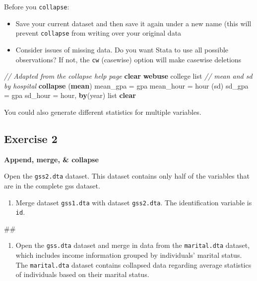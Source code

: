 \documentclass[
]{book}
\newenvironment{Shaded}{\begin{snugshade}}{\end{snugshade}}
\newcommand{\CommentTok}[1]{\textcolor[rgb]{0.56,0.35,0.01}{\textit{#1}}}
\newcommand{\FunctionTok}[1]{\textcolor[rgb]{0.00,0.00,0.00}{#1}}
\newcommand{\KeywordTok}[1]{\textcolor[rgb]{0.13,0.29,0.53}{\textbf{#1}}}
\newcommand{\NormalTok}[1]{#1}
\newcommand{\OtherTok}[1]{\textcolor[rgb]{0.56,0.35,0.01}{#1}}
\providecommand{\tightlist}{%
  \setlength{\itemsep}{0pt}\setlength{\parskip}{0pt}}
\begin{document}
Before you \texttt{collapse}:

\begin{itemize}
\tightlist
\item
  Save your current dataset and then save it again under a new name (this will prevent \texttt{collapse} from writing over your original data
\item
  Consider issues of missing data. Do you want Stata to use all possible observations? If not, the \texttt{cw} (casewise) option will make casewise deletions
\end{itemize}

\begin{Shaded}
\begin{Highlighting}[]
\CommentTok{// Adapted from the collapse help page}
\KeywordTok{clear}
\KeywordTok{webuse}\NormalTok{ college}
\OtherTok{list}
\CommentTok{// mean and sd by hospital}
\KeywordTok{collapse}\NormalTok{ (}\KeywordTok{mean}\NormalTok{) mean\_gpa = gpa mean\_hour = hour (}\FunctionTok{sd}\NormalTok{) sd\_gpa = gpa sd\_hour = hour, }\KeywordTok{by}\NormalTok{(}\FunctionTok{year}\NormalTok{)}
\OtherTok{list}
\KeywordTok{clear}
\end{Highlighting}
\end{Shaded}

You could also generate different statistics for multiple variables.

\hypertarget{exercise-2-5}{%
\subsection{Exercise 2}\label{exercise-2-5}}

\textbf{Append, merge, \& collapse}

Open the \texttt{gss2.dta} dataset. This dataset contains only half of the variables that are in the complete gss dataset.

\begin{enumerate}
\def\labelenumi{\arabic{enumi}.}
\tightlist
\item
  Merge dataset \texttt{gss1.dta} with dataset \texttt{gss2.dta}. The identification variable is \texttt{id}.
\end{enumerate}

\begin{Shaded}
\begin{Highlighting}[]
\NormalTok{\#\#}
\end{Highlighting}
\end{Shaded}

\begin{enumerate}
\def\labelenumi{\arabic{enumi}.}
\setcounter{enumi}{1}
\tightlist
\item
  Open the \texttt{gss.dta} dataset and merge in data from the \texttt{marital.dta} dataset, which includes income information grouped by individuals' marital status. The \texttt{marital.dta} dataset contains collapsed data regarding average statistics of individuals based on their marital status.
\end{enumerate}
\end{document}
